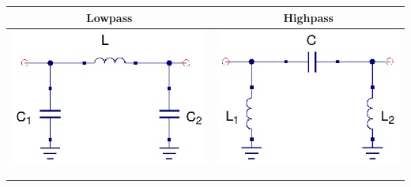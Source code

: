 \begin{table}[H]
  \centering
  \begin{tabular}{ | c | c | }
    \hline
    Lowpass & Highpass\\ \hline
    \begin{minipage}{.4\textwidth}
      \includegraphics[width=\linewidth]{./images/Synthesis/Impedance_Matching/Lowpass-Pi}
    \end{minipage}
    &
    \begin{minipage}{.4\textwidth}
      \includegraphics[width=\linewidth]{./images/Synthesis/Impedance_Matching/Highpass-Pi}
    \end{minipage}
\\ \hline
    \begin{minipage}{.4\textwidth}
         {\begin{align}

\end{align}}
\end{minipage}
\end{tabular}
\end{table}

